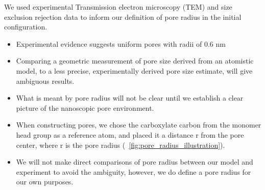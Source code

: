 \documentclass{article}
\begin{document}
  

  We used experimental Transmission electron microscopy (TEM) and size exclusion rejection
  data \cite{feng_scalable_2014,feng_thin_2016,zhou_supported_2005} to inform our definition
  of pore radius in the initial configuration.
  \begin{itemize}
    \item Experimental evidence suggests uniform pores with radii of 0.6 nm 
    \item Comparing a geometric measurement of pore size derived from an atomistic model,
    to a less precise, experimentally derived pore size estimate, will give ambiguous results.
    \item What is meant by pore radius will not be clear until we establish a clear picture
    of the nanoscopic pore environment.
    \item When constructing pores, we chose the carboxylate carbon from the monomer
    head group as a reference atom, and placed it a distance r from the pore center,
    where r is the pore radius (~\ref{fig:pore_radius_illustration}). %
    \item We will not make direct comparisons of pore radius between our model 
    and experiment to avoid the ambiguity, however, we do define a pore radius  
    for our own purposes.
  \end{itemize}
\end{document}
